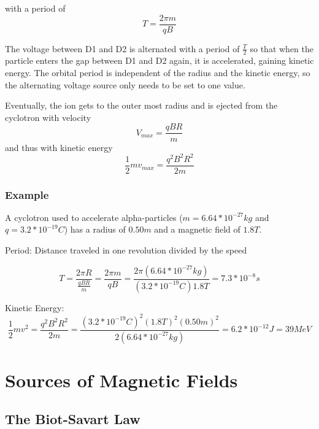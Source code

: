 \documentclass[14pt]{memoir}
\begin{document}
with a period of
\begin{equation}
T = \frac{2 \pi m}{qB}
\end{equation}

The voltage between D1 and D2 is alternated with a period of $\frac{T}{2}$ so that when the particle enters the gap between D1 and D2 again, it is accelerated, gaining kinetic energy. The orbital period is independent of the radius and the kinetic energy, so the alternating voltage source only needs to be set to one value. 

Eventually, the ion gets to the outer most radius and is ejected from the cyclotron with velocity
\begin{equation}
V_{max} = \frac{qBR}{m}
\end{equation}
and thus with kinetic energy
\begin{equation}
\frac{1}{2} m v_{max} = \frac{q^2 B^2 R^2}{2m} 
\end{equation}

\subsection{Example}

A cyclotron used to accelerate alpha-particles ($m = 6.64*10^{-27}kg$ and $q = 3.2*10^{-19}C$) has a radius of $0.50m$ and a magnetic field of $1.8T$. 

Period: Distance traveled in one revolution divided by the speed

\begin{equation}
T = \frac{2 \pi R}{\frac{q B R}{m}}=\frac{2 \pi m}{q B} = \frac{2 \pi (6.64*10^{-27}kg)}{(3.2*10^{-19}C){1.8T}} = 7.3*10^{-8} s
\end{equation}

Kinetic Energy:
\begin{equation}
\frac{1}{2} m v^2 = \frac{q^2 B^2 R^2}{2m} = \frac{(3.2*10^{-19}C)^2(1.8T)^2(0.50m)^2}{2(6.64*10^{-27}kg)} = 6.2 * 10^{-12} J = 39 MeV
\end{equation}

\chapter{Sources of Magnetic Fields}

\section{The Biot-Savart Law}
\end{document}

